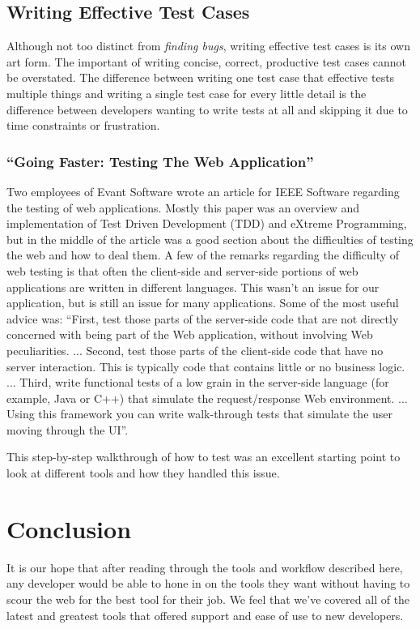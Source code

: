 \documentclass[12pt]{ucthesis}
\begin{document}
\section{Writing Effective Test Cases}
Although not too distinct from \emph{finding bugs}, writing effective test cases is its own art form. The important of writing concise, correct, productive test cases cannot be overstated. The difference between writing one test case that effective tests multiple things and writing a single test case for every little detail is the difference between developers wanting to write tests at all and skipping it due to time constraints or frustration.

\subsection{``Going Faster: Testing The Web Application''}
Two employees of Evant Software wrote an article for IEEE Software regarding the testing of web applications\cite{GoingFaster}. Mostly this paper was an overview and implementation of Test Driven Development (TDD) and eXtreme Programming, but in the middle of the article was a good section about the difficulties of testing the web and how to deal them. A few of the remarks regarding the difficulty of web testing is that often the client-side and server-side portions of web applications are written in different languages. This wasn't an issue for our application, but is still an issue for many applications. Some of the most useful advice was: ``First, test those parts of the server-side code that are not directly concerned with being part of the Web application, without involving Web peculiarities. ... Second, test those parts of the client-side code that have no server interaction. This is typically code that contains little or no business logic. ... Third, write functional tests of a low grain in the server-side language (for example, Java or C++) that simulate the request/response Web environment. ... Using this framework you can write walk-through tests that simulate the user moving through the UI''.

This step-by-step walkthrough of how to test was an excellent starting point to look at different tools and how they handled this issue.

\chapter{Conclusion}
It is our hope that after reading through the tools and workflow described here, any developer would be able to hone in on the tools they want without having to scour the web for the best tool for their job. We feel that we've covered all of the latest and greatest tools that offered support and ease of use to new developers.
\end{document}
